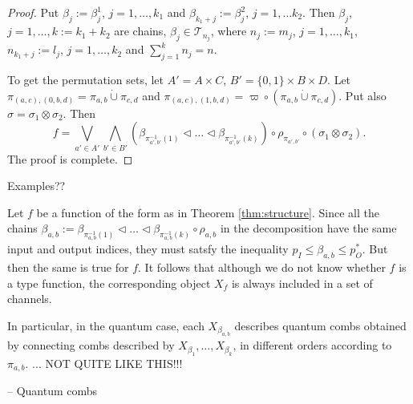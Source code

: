 \documentclass[12pt]{article}
\theoremstyle{definition}
\theoremstyle{remark}
\def\Te{\mathcal T}
\def\vtl{\vartriangleleft}
\begin{document}
\begin{proof}
Put  $\beta_j:=\beta^1_j$, $j=1,\dots, k_1$ and $\beta_{k_1+j}:=\beta^2_j$, $j=1,\dots
k_2$. Then $\beta_j$, $j=1,\dots,k:= k_1+k_2$ are chains, $\beta_j\in \Te_{n_j}$, where
$n_j:= m_j$, $j=1,\dots,k_1$, $n_{k_1+j}:=l_j$, $j=1,\dots,k_2$ and $\sum_{j=1}^k n_j=n$. 

To get the permutation sets, let $A'=A\times C$, $B'=\{0,1\}\times B\times D$. 
Let $\pi_{(a,c), (0,b,d)}=\pi_{a,b}\dot{\cup} \pi_{c,d}$ and $\pi_{(a,c),
(1,b,d)}=\varpi\circ (\pi_{a,b}\dot{\cup} \pi_{c,d})$. Put also $\sigma=\sigma_1\otimes
\sigma_2$. Then   
\[
f=\bigvee_{a'\in A'} \bigwedge_{b'\in B'}(\beta_{\pi^{-1}_{a',b'}(1)}\vtl \dots \vtl
\beta_{\pi^{-1}_{a',b'}(k)}) \circ \rho_{\pi_{a',b'}}\circ
(\sigma_1\otimes \sigma_2).
\]
The proof is complete.



\end{proof}

Examples??

Let $f$ be a function of the form as in Theorem \ref{thm:structure}. Since all the chains
$\beta_{a,b}:=\beta_{\pi^{-1}_{a,b}(1)}\vtl \dots \vtl \beta_{\pi^{-1}_{a,b}(k)}\circ
\rho_{a,b}$ in the
decomposition have the same input and  output indices, they must satsfy the inequality
$p_{I}\le \beta_{a,b} \le p_{O}^*$. But then the same is true for $f$.
It follows that although we do not know whether $f$ is a type function, the corresponding
object $X_f$ is always included in a set of channels.

In particular, in the quantum case, each $X_{\beta_{a,b}}$ describes quantum combs  obtained by
connecting combs described by  $X_{\beta_1},\dots, X_{\beta_k}$, in different orders
according to $\pi_{a,b}$. ... NOT QUITE LIKE THIS!!!










-- Quantum combs
\end{document}
